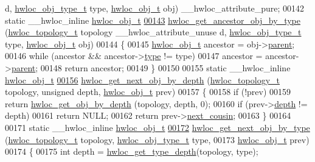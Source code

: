\begin{DoxyCode}
      d, \hyperlink{a00041_gacd37bb612667dc437d66bfb175a8dc55}{hwloc_obj_type_t} type, \hyperlink{a00016}{hwloc_obj_t} obj) \_\_hwloc\_attribute\_pure;
00142 \textcolor{keyword}{static} \_\_hwloc\_inline \hyperlink{a00016}{hwloc_obj_t}
\hypertarget{a00031_source_l00143}{}\hyperlink{a00053_gac93e1a95a71add57ac841daef1b94e5e}{00143} \hyperlink{a00053_gac93e1a95a71add57ac841daef1b94e5e}{hwloc_get_ancestor_obj_by_type} (\hyperlink{a00039_ga9d1e76ee15a7dee158b786c30b6a6e38}{hwloc_topology_t} topology \_\_hwloc\_attribute\_unuse
      d, \hyperlink{a00041_gacd37bb612667dc437d66bfb175a8dc55}{hwloc_obj_type_t} type, \hyperlink{a00016}{hwloc_obj_t} obj)
00144 \{
00145   \hyperlink{a00016}{hwloc_obj_t} ancestor = obj->\hyperlink{a00016_adc494f6aed939992be1c55cca5822900}{parent};
00146   \textcolor{keywordflow}{while} (ancestor && ancestor->\hyperlink{a00016_acc4f0803f244867e68fe0036800be5de}{type} != type)
00147     ancestor = ancestor->\hyperlink{a00016_adc494f6aed939992be1c55cca5822900}{parent};
00148   \textcolor{keywordflow}{return} ancestor;
00149 \}
00150 
00155 \textcolor{keyword}{static} \_\_hwloc\_inline \hyperlink{a00016}{hwloc_obj_t}
\hypertarget{a00031_source_l00156}{}\hyperlink{a00053_gab7c1dce3f42ece5bfa621e87cf332418}{00156} \hyperlink{a00053_gab7c1dce3f42ece5bfa621e87cf332418}{hwloc_get_next_obj_by_depth} (\hyperlink{a00039_ga9d1e76ee15a7dee158b786c30b6a6e38}{hwloc_topology_t} topology, \textcolor{keywordtype}{unsigned} depth, 
      \hyperlink{a00016}{hwloc_obj_t} prev)
00157 \{
00158   \textcolor{keywordflow}{if} (!prev)
00159     \textcolor{keywordflow}{return} \hyperlink{a00047_gaedd78240b0c1108355586a268ec5a697}{hwloc_get_obj_by_depth} (topology, depth, 0);
00160   \textcolor{keywordflow}{if} (prev->\hyperlink{a00016_a9d82690370275d42d652eccdea5d3ee5}{depth} != depth)
00161     \textcolor{keywordflow}{return} NULL;
00162   \textcolor{keywordflow}{return} prev->\hyperlink{a00016_a85a788017457129589318b6c39451acf}{next_cousin};
00163 \}
00164 
00171 \textcolor{keyword}{static} \_\_hwloc\_inline \hyperlink{a00016}{hwloc_obj_t}
\hypertarget{a00031_source_l00172}{}\hyperlink{a00053_ga5f08ceb69375341e73563cfe2e77534e}{00172} \hyperlink{a00053_ga5f08ceb69375341e73563cfe2e77534e}{hwloc_get_next_obj_by_type} (\hyperlink{a00039_ga9d1e76ee15a7dee158b786c30b6a6e38}{hwloc_topology_t} topology, \hyperlink{a00041_gacd37bb612667dc437d66bfb175a8dc55}{hwloc_obj_type_t} type,
00173                    \hyperlink{a00016}{hwloc_obj_t} prev)
00174 \{
00175   \textcolor{keywordtype}{int} depth = \hyperlink{a00046_gaea7c64dd59467f5201ba87712710b14d}{hwloc_get_type_depth}(topology, type);

\end{DoxyCode}
